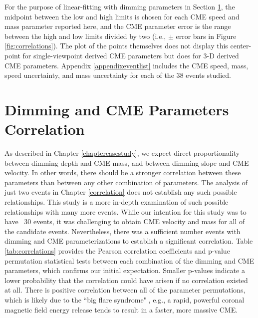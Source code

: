 For the purpose of linear-fitting with dimming parameters in Section \ref{sec:correlation}, the midpoint between the low and high limits is chosen for each CME speed and mass parameter reported here, and the CME parameter error is the range between the high and low limits divided by two (i.e., $\pm$ error bars in Figure \ref{fig:correlations}). The plot of the points themselves does not display this center-point for single-viewpoint derived CME parameters but does for 3-D derived CME parameters. Appendix \ref{appendixeventlist} includes the CME speed, mass, speed uncertainty, and mass uncertainty for each of the 38 events studied.

\section{Dimming and CME Parameters Correlation}
\label{sec:correlation}
As described in Chapter \ref{chaptercasestudy}, we expect direct proportionality between dimming depth and CME mass, and between dimming slope and CME velocity. In other words, there should be a stronger correlation between these parameters than between any other combination of parameters. The analysis of just two events in Chapter \ref{correlation} does not establish any such possible relationships. This study is a more in-depth examination of such possible relationships with many more events. While our intention for this study was to have ~30 events, it was challenging to obtain CME velocity and mass for all of the candidate events. Nevertheless, there was a sufficient number events with dimming and CME parameterizations to establish a significant correlation. Table \ref{tab:correlations} provides the Pearson correlation coefficients \citep{Pearson1895} and p-value permutation statistical tests between each combination of the dimming and CME parameters, which confirms our initial expectation. Smaller p-values indicate a lower probability that the correlation could have arisen if no correlation existed at all. There is positive correlation between all of the parameter permutations, which is likely due to the ``big flare syndrome" \citep{Kahler1982, Kahler1992}, e.g., a rapid, powerful coronal magnetic field energy release tends to result in a faster, more massive CME. 

